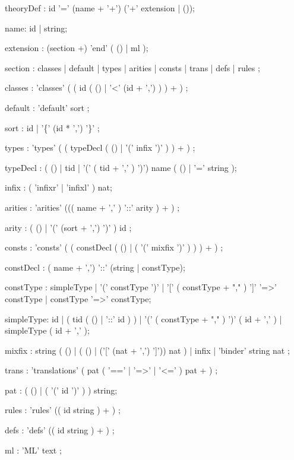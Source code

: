 \begin{rail}

theoryDef : id '=' (name + '+') ('+' extension | ());

name: id | string;

extension : (section +) 'end' ( () | ml );

section : classes
        | default
        | types
        | arities
        | consts
        | trans
        | defs
        | rules
        ;

classes : 'classes' ( ( id (  ()
                            | '<' (id + ',')
                           ) 
                       ) + )
        ;

default : 'default' sort 
        ;

sort :  id
     | '\{' (id * ',') '\}'
     ;

types : 'types' ( ( typeDecl ( () | '(' infix ')' ) ) + )
      ;

typeDecl : ( () | tid | '(' ( tid + ',' ) ')') name ( () | '='  string );

infix : ( 'infixr' | 'infixl' ) nat;


arities : 'arities' ((( name + ',' ) '::' arity ) + )
        ;

arity   : ( () 
          | '(' (sort + ',') ')' 
          ) id
        ;


consts : 'consts' ( ( constDecl ( () | ( '(' mixfix ')' ) ) ) + )
       ;

constDecl : ( name + ',') '::' (string | constType);

constType : simpleType | '(' constType ')' | '[' ( constType + "," ) ']'
            '=>' constType | constType '=>' constType;

simpleType: id | ( tid ( () | '::' id ) ) |
            '(' ( constType + "," ) ')' ( id + ',' ) | simpleType ( id + ',' );

mixfix :  string ( () | ( () | ('[' (nat + ',') ']')) nat )
       | infix
       | 'binder' string nat ;

trans : 'translations' ( pat ( '==' | '=>' | '<=' ) pat + )
      ;

pat : ( () | ( '(' id ')' ) ) string;

rules : 'rules' (( id string ) + )
      ;

defs : 'defs' (( id string ) + )
     ;

ml : 'ML' text
   ;

\end{rail}
